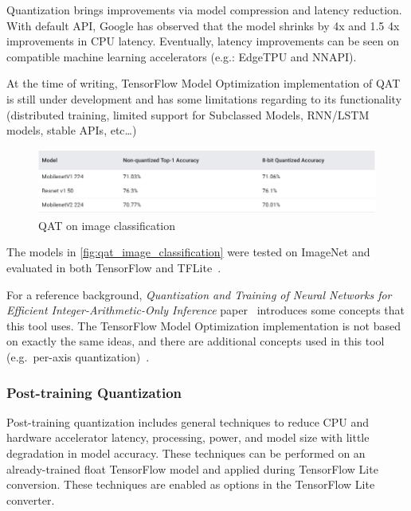 Quantization brings improvements via model compression and latency reduction.
With default API, Google has observed that the model shrinks by 4x and 1.5 \-
4x improvements in CPU latency. Eventually, latency improvements can be seen on
compatible machine learning accelerators (e.g.: EdgeTPU and NNAPI).

At the time of writing, TensorFlow Model Optimization implementation of QAT is
still under development and has some limitations regarding to its functionality
(distributed training, limited support for Subclassed Models, RNN/LSTM models,
stable APIs, etc\ldots)

\begin{figure}[ht]
    \includegraphics[width=\textwidth]{images/introduction/qat_image_classification.png}
    \centering
    \caption{QAT on image classification}\label{fig:qat_image_classification}
\end{figure}

The models in \autoref{fig:qat_image_classification} were tested on ImageNet
and evaluated in both TensorFlow and TFLite~\cite{tfmot:quantization_training}.

For a reference background, \textit{Quantization and Training
of Neural Networks for Efficient Integer-Arithmetic-Only Inference}
paper~\cite{Jacob_2018} introduces some concepts that this tool uses.
The TensorFlow Model Optimization implementation is not based on exactly the
same ideas, and there are additional concepts used in this tool (e.g.\ per-axis
quantization)~\cite{tfmot:quantization_training}.

\subsubsection{Post-training Quantization}
Post-training quantization includes general techniques to reduce CPU and
hardware accelerator latency, processing, power, and model size with little
degradation in model accuracy. These techniques can be performed on an
already-trained float TensorFlow model and applied during TensorFlow Lite
conversion. These techniques are enabled as options in the TensorFlow Lite
converter.

